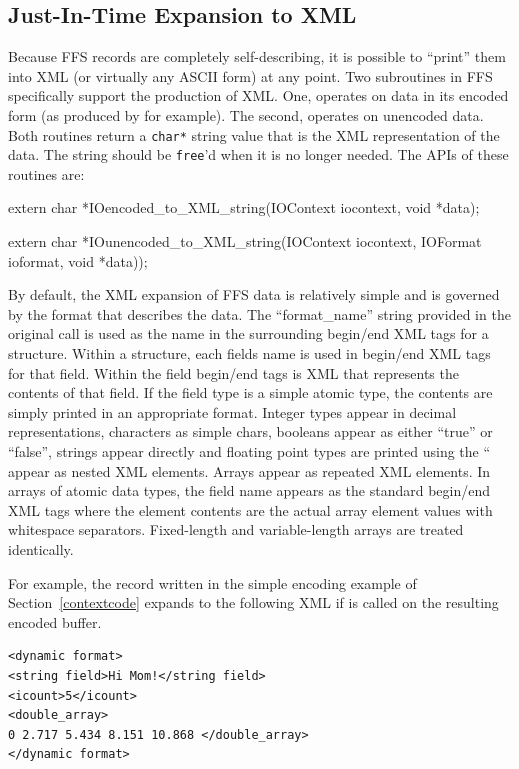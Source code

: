 \subsection{Just-In-Time Expansion to XML}

Because FFS records are completely self-describing, it is possible to
``print'' them into XML (or virtually any ASCII form) at any point.  Two
subroutines in FFS specifically support the production of XML.  One,
 operates on data in its encoded form
(as produced by  for example).  The
second,  operates on unencoded data.
Both routines return a {\tt char*} string value that is the XML
representation of the data.  The string should be {\tt free}'d when it is no
longer needed.  The APIs of these routines are:
\begin{WrapCode}
extern char *IOencoded_to_XML_string(IOContext iocontext, void *data);

extern char *IOunencoded_to_XML_string(IOContext iocontext, IOFormat ioformat, void *data));
\end{WrapCode}
By default, the XML expansion of FFS data is relatively simple and is
governed by the format that describes the data.  The
``format\_name'' string provided in the original
 call is used as the name in the
surrounding begin/end XML tags for a structure.  Within a structure, each
fields name is used in begin/end XML tags for that field.  Within the field
begin/end tags is XML that represents the contents of that field.  If the
field type is a simple atomic type, the contents are simply printed in an
appropriate format.  Integer types appear in decimal representations,
characters as simple chars, booleans appear as either ``true'' or ``false'',
strings appear directly and floating point types are printed using the
``%
appear as nested XML elements.  Arrays appear as repeated XML elements.  In
arrays of atomic data types, the field name appears as the standard
begin/end XML tags where the element contents are the actual array element
values with whitespace separators.  Fixed-length and variable-length arrays
are treated identically.

For example, the record written in the simple encoding example of
Section~\ref{contextcode} expands to the following XML if
 is called on the resulting encoded
buffer. 
\begin{verbatim}
<dynamic format>
<string field>Hi Mom!</string field>
<icount>5</icount>
<double_array>
0 2.717 5.434 8.151 10.868 </double_array>
</dynamic format>
\end{verbatim}

